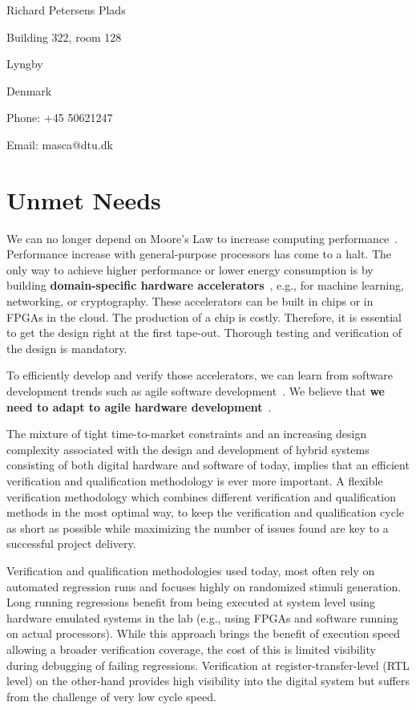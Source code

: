 \documentclass[fleqn,12pt]{article}
\begin{document}
\noindent Richard Petersens Plads

\noindent Building 322, room 128

 Lyngby

\noindent Denmark

\bigskip


\noindent Phone: +45 50621247

\noindent Email: masca@dtu.dk


\newpage
\section*{Unmet Needs}

We can no longer depend on Moore's Law to increase computing performance~\cite{dark-silicon:2011}.
Performance increase with general-purpose processors has come to a halt.
The only way to achieve higher performance or lower energy consumption
is by building {\bf domain-specific hardware accelerators}~\cite{domain-hw-acc:2020},
e.g., for machine learning, networking, or cryptography.
These accelerators can be built in chips or in FPGAs in the cloud.
The production of a chip is costly. Therefore, it is essential to get
the design right at the first tape-out. Thorough testing and verification of the design is mandatory.

To efficiently develop and verify those accelerators, we can learn from software development trends such as agile software development~\cite{agile:manifesto}.
We believe that {\bf we need to adapt to agile hardware development}~\cite{henn-patt:turing:2019}.

The mixture of tight time-to-market constraints and an increasing design complexity associated with the design and development of hybrid systems consisting of both digital hardware and software of today, implies that an efficient verification and qualification methodology is ever more important. 
A flexible verification methodology which combines different verification and qualification methods in the most optimal way, to keep the verification and qualification cycle as short as possible while maximizing the number of issues found are key to a successful project delivery.

Verification and qualification methodologies used today, most often rely on automated regression runs and focuses highly on randomized stimuli generation. Long running regressions benefit from being executed at system level using hardware emulated systems in the lab (e.g., using FPGAs and software running on actual processors). While this approach brings the benefit of execution speed allowing a broader verification coverage, the cost of this is limited visibility during debugging of failing regressions. Verification at register-transfer-level (RTL level) on the other-hand provides high visibility into the digital system but suffers from the challenge of very low cycle speed.
\end{document}
